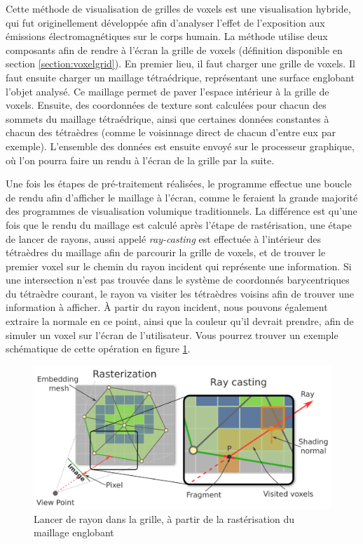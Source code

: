 {{{			Cette méthode de visualisation de grilles de voxels est une visualisation hybride, qui fut originellement développée afin d'analyser l'effet de l'exposition aux émissions électromagnétiques sur le corps humain. La méthode utilise deux composants afin de rendre à l'écran la grille de voxels (définition disponible en section \ref{section:voxelgrid}). En premier lieu, il faut charger une grille de voxels. Il faut ensuite charger un maillage tétraédrique, représentant une surface englobant l'objet analysé. Ce maillage permet de paver l'espace intérieur à la grille de voxels. Ensuite, des coordonnées de texture sont calculées pour chacun des sommets du maillage tétraédrique, ainsi que certaines données constantes à chacun des tétraèdres (comme le voisinnage direct de chacun d'entre eux par exemple). L'ensemble des données est ensuite envoyé sur le processeur graphique, où l'on pourra faire un rendu à l'écran de la grille par la suite.

			Une fois les étapes de pré-traitement réalisées, le programme effectue une boucle de rendu afin d'afficher le maillage à l'écran, comme le feraient la grande majorité des programmes de visualisation volumique traditionnels. La différence est qu'une fois que le rendu du maillage est calculé après l'étape de rastérisation, une étape de lancer de rayons, aussi appelé \textit{ray-casting} est effectuée à l'intérieur des tétraèdres du maillage afin de parcourir la grille de voxels, et de trouver le premier voxel sur le chemin du rayon incident qui représente une information. Si une intersection n'est pas trouvée dans le système de coordonnés barycentriques du tétraèdre courant, le rayon va visiter les tétraèdres voisins afin de trouver une information à afficher. À partir du rayon incident, nous pouvons également extraire la normale en ce point, ainsi que la couleur qu'il devrait prendre, afin de simuler un voxel sur l'écran de l'utilisateur. Vous pourrez trouver un exemple schématique de cette opération en figure \ref{img:kpf_principle}.

			\begin{figure}[h]
			    \centering
			    \includegraphics[width=.8\linewidth]{img/raytracing_grid_principle.png}
			    \caption{Lancer de rayon dans la grille, à partir de la rastérisation du maillage englobant}
			    \label{img:kpf_principle}
			\end{figure}

}}}

